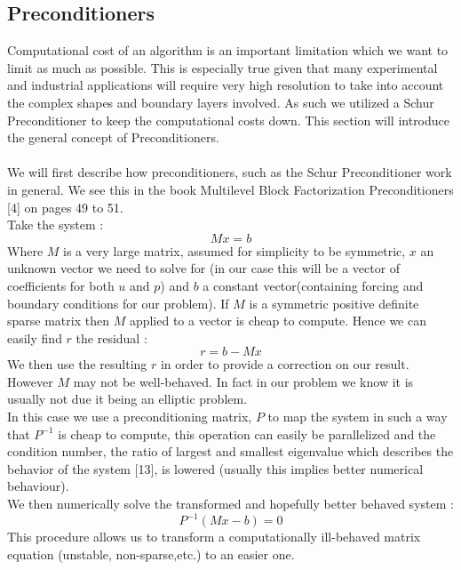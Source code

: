 \documentclass[11pt,twoside,a4paper]{article}
\begin{document}
\subsection{Preconditioners}
Computational cost of an algorithm is an important limitation which we want to limit as much as possible. This is especially true given that many experimental and industrial applications will require very high resolution to take into account the complex shapes and boundary layers involved. As such we utilized a Schur Preconditioner to keep the computational costs down. This section will introduce the general concept of Preconditioners.\\
\\
We will first describe how preconditioners, such as the Schur Preconditioner work in general. We see this in the book Multilevel Block Factorization Preconditioners [4] on pages 49 to 51.\\
Take the system :\\
$$
Mx = b
$$
Where $M$ is a very large matrix, assumed for simplicity to be symmetric, $x$ an unknown vector we need to solve for (in our case this will be a vector of coefficients for both $u$ and $p$) and $b$ a constant vector(containing forcing and boundary conditions for our problem). If $M$ is a symmetric positive definite sparse matrix then $M$ applied to a vector is cheap to compute. Hence we can easily find $r$ the residual :\\
$$
r = b - Mx
$$
We then use the resulting $r$ in order to provide a correction on our result.\\
However $M$ may not be well-behaved. In fact in our problem we know it is usually not due it being an elliptic problem.\\
In this case we use a preconditioning matrix, $P$ to map the system in such a way that $P^{-1}$ is cheap to compute, this operation can easily be parallelized and the condition number, the ratio of largest and smallest eigenvalue which describes the behavior of the system [13], is lowered (usually this implies better numerical behaviour).\\
We then numerically solve the transformed and hopefully better behaved system :
$$
P^{-1}(Mx-b) = 0
$$
This procedure allows us to transform a computationally ill-behaved matrix equation (unstable, non-sparse,etc.) to an easier one.
\end{document}
